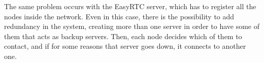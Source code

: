 The same problem occurs with the EasyRTC server, which has to register all the nodes inside the network. Even in this case, there is the possibility to add redundancy in the system, creating more than one server in order to have some of them that acts as backup servers. Then, each node decides which of them to contact, and if for some reasons that server goes down, it connects to another one. 
